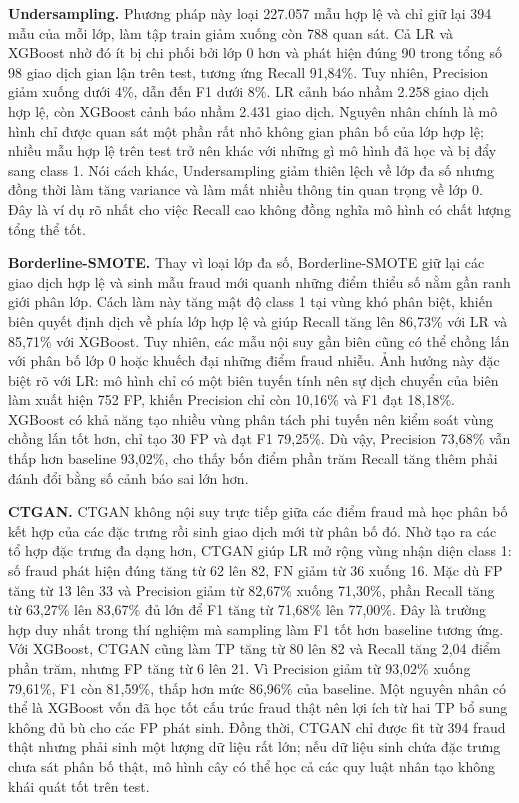 \documentclass[12pt,a4paper]{article}
\begin{document}
\textbf{Undersampling.} Phương pháp này loại 227.057 mẫu hợp lệ và chỉ giữ lại 394 mẫu của mỗi lớp, làm tập train giảm xuống còn 788 quan sát. Cả LR và XGBoost nhờ đó ít bị chi phối bởi lớp 0 hơn và phát hiện đúng 90 trong tổng số 98 giao dịch gian lận trên test, tương ứng Recall 91,84\%. Tuy nhiên, Precision giảm xuống dưới 4\%, dẫn đến F1 dưới 8\%. LR cảnh báo nhầm 2.258 giao dịch hợp lệ, còn XGBoost cảnh báo nhầm 2.431 giao dịch. Nguyên nhân chính là mô hình chỉ được quan sát một phần rất nhỏ không gian phân bố của lớp hợp lệ; nhiều mẫu hợp lệ trên test trở nên khác với những gì mô hình đã học và bị đẩy sang class 1. Nói cách khác, Undersampling giảm thiên lệch về lớp đa số nhưng đồng thời làm tăng variance và làm mất nhiều thông tin quan trọng về lớp 0. Đây là ví dụ rõ nhất cho việc Recall cao không đồng nghĩa mô hình có chất lượng tổng thể tốt.

\textbf{Borderline-SMOTE.} Thay vì loại lớp đa số, Borderline-SMOTE giữ lại các giao dịch hợp lệ và sinh mẫu fraud mới quanh những điểm thiểu số nằm gần ranh giới phân lớp. Cách làm này tăng mật độ class 1 tại vùng khó phân biệt, khiến biên quyết định dịch về phía lớp hợp lệ và giúp Recall tăng lên 86,73\% với LR và 85,71\% với XGBoost. Tuy nhiên, các mẫu nội suy gần biên cũng có thể chồng lấn với phân bố lớp 0 hoặc khuếch đại những điểm fraud nhiễu. Ảnh hưởng này đặc biệt rõ với LR: mô hình chỉ có một biên tuyến tính nên sự dịch chuyển của biên làm xuất hiện 752 FP, khiến Precision chỉ còn 10,16\% và F1 đạt 18,18\%. XGBoost có khả năng tạo nhiều vùng phân tách phi tuyến nên kiểm soát vùng chồng lấn tốt hơn, chỉ tạo 30 FP và đạt F1 79,25\%. Dù vậy, Precision 73,68\% vẫn thấp hơn baseline 93,02\%, cho thấy bốn điểm phần trăm Recall tăng thêm phải đánh đổi bằng số cảnh báo sai lớn hơn.

\textbf{CTGAN.} CTGAN không nội suy trực tiếp giữa các điểm fraud mà học phân bố kết hợp của các đặc trưng rồi sinh giao dịch mới từ phân bố đó. Nhờ tạo ra các tổ hợp đặc trưng đa dạng hơn, CTGAN giúp LR mở rộng vùng nhận diện class 1: số fraud phát hiện đúng tăng từ 62 lên 82, FN giảm từ 36 xuống 16. Mặc dù FP tăng từ 13 lên 33 và Precision giảm từ 82,67\% xuống 71,30\%, phần Recall tăng từ 63,27\% lên 83,67\% đủ lớn để F1 tăng từ 71,68\% lên 77,00\%. Đây là trường hợp duy nhất trong thí nghiệm mà sampling làm F1 tốt hơn baseline tương ứng. Với XGBoost, CTGAN cũng làm TP tăng từ 80 lên 82 và Recall tăng 2,04 điểm phần trăm, nhưng FP tăng từ 6 lên 21. Vì Precision giảm từ 93,02\% xuống 79,61\%, F1 còn 81,59\%, thấp hơn mức 86,96\% của baseline. Một nguyên nhân có thể là XGBoost vốn đã học tốt cấu trúc fraud thật nên lợi ích từ hai TP bổ sung không đủ bù cho các FP phát sinh. Đồng thời, CTGAN chỉ được fit từ 394 fraud thật nhưng phải sinh một lượng dữ liệu rất lớn; nếu dữ liệu sinh chứa đặc trưng chưa sát phân bố thật, mô hình cây có thể học cả các quy luật nhân tạo không khái quát tốt trên test.
\end{document}
